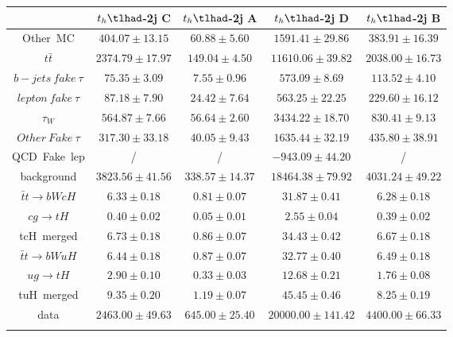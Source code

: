 \begin{tabular}{ccccc} \toprule\toprule
 & $t_{h}\tlhad$-2j C & $t_{h}\tlhad$-2j A & $t_{h}\tlhad$-2j D & $t_{h}\tlhad$-2j B\\\midrule
Other~MC & $404.07\pm13.15$ & $60.88\pm5.60$ & $1591.41\pm29.86$ & $383.91\pm16.39$\\
$t\bar{t}$ & $2374.79\pm17.97$ & $149.04\pm4.50$ & $11610.06\pm39.82$ & $2038.00\pm16.73$\\
$b-jets~fake~\tau$ & $75.35\pm3.09$ & $7.55\pm0.96$ & $573.09\pm8.69$ & $113.52\pm4.10$\\
$lepton~fake~\tau$ & $87.18\pm7.90$ & $24.42\pm7.64$ & $563.25\pm22.25$ & $229.60\pm16.12$\\
$\tau_{W}$ & $564.87\pm7.66$ & $56.64\pm2.60$ & $3434.22\pm18.70$ & $830.41\pm9.13$\\
$Other~Fake~\tau$ & $317.30\pm33.18$ & $40.05\pm9.43$ & $1635.44\pm32.19$ & $435.80\pm38.91$\\
QCD~Fake~lep &  / &  / & $-943.09\pm44.20$ &  /\\
background & $3823.56\pm41.56$ & $338.57\pm14.37$ & $18464.38\pm79.92$ & $4031.24\pm49.22$\\\midrule
$\bar{t}t\to bWcH$ & $6.33\pm0.18$ & $0.81\pm0.07$ & $31.87\pm0.41$ & $6.28\pm0.18$\\
$cg\to tH$ & $0.40\pm0.02$ & $0.05\pm0.01$ & $2.55\pm0.04$ & $0.39\pm0.02$\\
tcH~merged & $6.73\pm0.18$ & $0.86\pm0.07$ & $34.43\pm0.42$ & $6.67\pm0.18$\\
$\bar{t}t\to bWuH$ & $6.44\pm0.18$ & $0.87\pm0.07$ & $32.77\pm0.40$ & $6.49\pm0.18$\\
$ug\to tH$ & $2.90\pm0.10$ & $0.33\pm0.03$ & $12.68\pm0.21$ & $1.76\pm0.08$\\
tuH~merged & $9.35\pm0.20$ & $1.19\pm0.07$ & $45.45\pm0.46$ & $8.25\pm0.19$\\\midrule
data & $2463.00\pm49.63$ & $645.00\pm25.40$ & $20000.00\pm141.42$ & $4400.00\pm66.33$\\
\bottomrule\bottomrule\\
\end{tabular}
